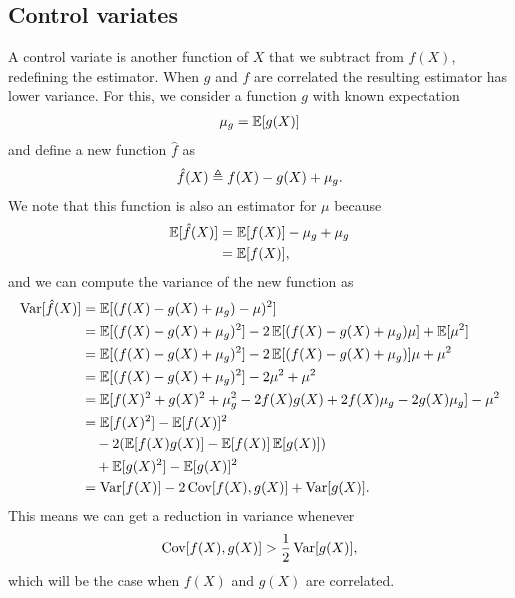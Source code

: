   \subsection{Control variates}
    A control variate is another function of $X$ that we subtract from $f(X)$, redefining the estimator. When $g$ and $f$ are correlated the resulting estimator has lower variance. For this, we consider a function $g$ with known expectation
    \begin{align*}
      \mu_{g} = \operatorname{\mathbb{E}} [ g(X) ]
    \end{align*}
    and define a new function $\hat{f}$ as
    \begin{align*}
      \hat{f}(X) \triangleq f(X) - g(X) + \mu_{g}.
    \end{align*}
    We note that this function is also an estimator for $\mu$ because
    \begin{align*}
        \operatorname{\mathbb{E}} [ \hat{f}(X) ] &= \operatorname{\mathbb{E}} [ f(X) ] - \mu_{g} + \mu_{g} \\
            &= \operatorname{\mathbb{E}} [ f(X) ],
    \end{align*}
    and we can compute the variance of the new function as
    \begin{align*}
      \operatorname{Var} [ \hat{f}(X) ]
        &= \operatorname{\mathbb{E}} [ (f(X) - g(X) + \mu_{g}) - \mu)^2 ] \\
        &= \operatorname{\mathbb{E}} [ (f(X) - g(X) + \mu_{g})^2 ] - 2\operatorname{\mathbb{E}} [ (f(X) - g(X) + \mu_{g})\mu ] + \operatorname{\mathbb{E}} [ \mu^2 ] \\
        &= \operatorname{\mathbb{E}} [ (f(X) - g(X) + \mu_{g})^2 ] - 2\operatorname{\mathbb{E}} [ (f(X) - g(X) + \mu_{g})]\mu + \mu^2 \\
        &= \operatorname{\mathbb{E}} [ (f(X) - g(X) + \mu_{g})^2 ] - 2\mu^2  + \mu^2 \\
        &= \operatorname{\mathbb{E}} [ f(X)^2 + g(X)^2 + \mu_{g}^2 - 2f(X)g(X) + 2f(X)\mu_{g} - 2g(X)\mu_{g} ] - \mu^2\\
        &= \operatorname{\mathbb{E}} [ f(X)^2 ] - \operatorname{\mathbb{E}} [ f(X) ]^2 \\
          &\quad - 2(\operatorname{\mathbb{E}} [ f(X)g(X) ] - \operatorname{\mathbb{E}} [ f(X) ]\operatorname{\mathbb{E}} [ g(X) ]) \\
          &\quad + \operatorname{\mathbb{E}} [ g(X)^2 ] - \operatorname{\mathbb{E}} [ g(X) ]^2 \\
        &= \operatorname{Var} [ f(X) ] - 2  \operatorname{Cov} [ f(X), g(X) ] + \operatorname{Var} [ g(X) ].
    \end{align*}
    This means we can get a reduction in variance whenever
    \begin{equation}
      \operatorname{Cov} [ f(X), g(X) ] > \frac{1}{2} \operatorname{Var} [ g(X) ],
      \label{eq:variance-reduction}
    \end{equation}
    which will be the case when $f(X)$ and $g(X)$ are correlated.

